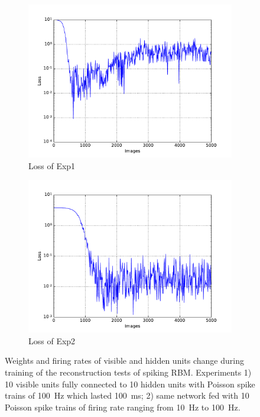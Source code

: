 \begin{figure}
\begin{subfigure}[t]{0.4\textwidth}
		\includegraphics[width=\textwidth]{pics_sdlm/11_exp_SRBM_Orig_long/exp1_mse_nons.pdf}
		\caption{Loss of Exp1}
	\end{subfigure}
	\begin{subfigure}[t]{0.4\textwidth}
		\includegraphics[width=\textwidth]{pics_sdlm/11_exp_SRBM_Orig_long/exp2_mse_nons.pdf}
		\caption{Loss of Exp2}
	\end{subfigure}
	\caption{Weights and firing rates of visible and hidden units change during training of the reconstruction tests of spiking RBM. 
		Experiments 1) 10 visible units fully connected to 10 hidden units with Poisson spike trains of 100~Hz which lasted 100~ms; 2) same network fed with 10 Poisson spike trains of firing rate ranging from 10~Hz to 100~Hz.}
\end{figure}
